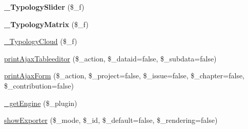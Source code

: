 \begin{DoxyCompactItemize}
\item 
\hypertarget{classrokfor___t_e_m_p_l_a_t_e_s_a0d25e2cdfea0007d00bf3f030a9a9871}{
{\bfseries \-\_\-\-Typology\-Slider} (\$\-\_\-f)}
\label{classrokfor___t_e_m_p_l_a_t_e_s_a0d25e2cdfea0007d00bf3f030a9a9871}

\item 
\hypertarget{classrokfor___t_e_m_p_l_a_t_e_s_a6ee2a9c71e8ad387fc5d576debe283b5}{
{\bfseries \-\_\-\-Typology\-Matrix} (\$\-\_\-f)}
\label{classrokfor___t_e_m_p_l_a_t_e_s_a6ee2a9c71e8ad387fc5d576debe283b5}

\item 
\hyperlink{classrokfor___t_e_m_p_l_a_t_e_s_a382021d6178ba9c89d2659c7aa8ec70e}{\-\_\-\-Typology\-Cloud} (\$\-\_\-f)
\item 
\hyperlink{classrokfor___t_e_m_p_l_a_t_e_s_a2c935e78f23de8eb7ec5620620cc08cf}{print\-Ajax\-Tableeditor} (\$\-\_\-action, \$\-\_\-dataid=false, \$\-\_\-subdata=false)
\item 
\hyperlink{classrokfor___t_e_m_p_l_a_t_e_s_a0ad10c2211e451fd6d384330efa51e42}{print\-Ajax\-Form} (\$\-\_\-action, \$\-\_\-project=false, \$\-\_\-issue=false, \$\-\_\-chapter=false, \$\-\_\-contribution=false)
\item 
\hyperlink{classrokfor___t_e_m_p_l_a_t_e_s_ac2401ef8bd76023034f527716d329d3b}{\-\_\-get\-Engine} (\$\-\_\-plugin)
\item 
\hyperlink{classrokfor___t_e_m_p_l_a_t_e_s_ad13500ef907a3bb129196cde0572830b}{show\-Exporter} (\$\-\_\-mode, \$\-\_\-id, \$\-\_\-default=false, \$\-\_\-rendering=false)
\end{DoxyCompactItemize}
